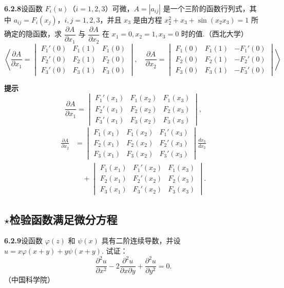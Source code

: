 \documentclass[UTF8, 12pt, fontset=fandol, oneside]{ctexart}
\begin{document}
\noindent\textbf{6.2.8}\quad 设函数 $F_i(u)$（$i=1,2,3$）可微，$A=|a_{ij}|$ 是一个三阶的函数行列式，其中 $a_{ij}=F_i(x_j)$，$i,j=1,2,3$，并且 $x_3$ 是由方程 $x_2^2+x_3+\sin(x_2x_3)=1$ 所确定的隐函数，求 $\dfrac{\partial A}{\partial x_1}$ 与 $\dfrac{\partial A}{\partial x_2}$ 在 $x_1=0,x_2=1,x_3=0$ 时的值.（西北大学）
\[
  \left\langle
  \frac{\partial A}{\partial x_1}=
  \begin{vmatrix}
  F_1'(0)&F_1(1)&F_1(0)\\
  F_2'(0)&F_2(1)&F_2(0)\\
  F_3'(0)&F_3(1)&F_3(0)
  \end{vmatrix},\quad
  \frac{\partial A}{\partial x_2}=
  \begin{vmatrix}
  F_1(0)&F_1(1)&-F_1'(0)\\
  F_2(0)&F_2(1)&-F_2'(0)\\
  F_3(0)&F_3(1)&-F_3'(0)
  \end{vmatrix}
  \right\rangle
\]

\noindent\textbf{提示}\quad
\[
  \frac{\partial A}{\partial x_1}=
  \begin{vmatrix}
  F_1'(x_1)&F_1(x_2)&F_1(x_3)\\
  F_2'(x_1)&F_2(x_2)&F_2(x_3)\\
  F_3'(x_1)&F_3(x_2)&F_3(x_3)
  \end{vmatrix},
\]
\[
\begin{aligned}
\frac{\partial A}{\partial x_2}
&=
  \begin{vmatrix}
  F_1(x_1)&F_1(x_2)&F_1'(x_3)\\
  F_2(x_1)&F_2(x_2)&F_2'(x_3)\\
  F_3(x_1)&F_3(x_2)&F_3'(x_3)
  \end{vmatrix}\frac{dx_3}{dx_2}\\
&\quad+
  \begin{vmatrix}
  F_1(x_1)&F_1'(x_2)&F_1(x_3)\\
  F_2(x_1)&F_2'(x_2)&F_2(x_3)\\
  F_3(x_1)&F_3'(x_2)&F_3(x_3)
  \end{vmatrix}.
\end{aligned}
\]

\subsection*{\ensuremath{\star}检验函数满足微分方程}

\noindent\textbf{6.2.9}\quad 设函数 $\varphi(z)$ 和 $\psi(x)$ 具有二阶连续导数，并设 $u=x\varphi(x+y)+y\psi(x+y)$. 试证：
\[
  \frac{\partial^2u}{\partial x^2}-2\frac{\partial^2u}{\partial x\partial y}
  +\frac{\partial^2u}{\partial y^2}=0.
\]
（中国科学院）
\end{document}
